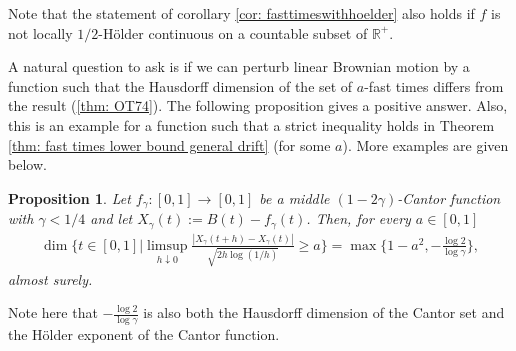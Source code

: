 \documentclass[11pt, reqno]{amsart}
\theoremstyle{plain}
\newtheorem{proposition}[theorem]{Proposition}
\theoremstyle{definition}
\theoremstyle{remark}
\begin{document}
Note that the statement of corollary \ref{cor: fasttimeswithhoelder} also holds if $f$ is not locally $1/2$-{H\"{o}lder } continuous on a countable subset of ${\mathbb{R}}^+$.

A natural question to ask is if we can perturb linear Brownian motion by a function such that the Hausdorff dimension of the set of $a$-fast times differs from the result (\ref{thm: OT74}). The following proposition gives a positive answer.
Also, this is an example for a function such that a strict inequality holds in Theorem \ref{thm: fast times lower bound general drift} (for some $a$).
More examples are given below.
\begin{proposition}\label{prop: fasttimeswithCantorfunction}
Let $f_\gamma \colon [0,1] \to [0,1]$ be a middle $(1-2\gamma)$-Cantor function with $\gamma <1/4$ and let $X_\gamma(t):= B(t)-f_\gamma(t)$. Then, for every $a\in[0,1]$
\begin{align*}
\dim \Big\{ t\in[0,1] \Big| \limsup_{h \downarrow 0} \frac{|X_\gamma(t+h)-X_\gamma(t)|}{\sqrt{2h\log{(1/h)}}} \geq a \Big\}  = \max\Big\{1-a^2, -\frac{\log2}{\log\gamma}\Big\},
\end{align*}
almost surely.
\end{proposition}

Note here that $-\frac{\log2}{\log\gamma}$ is also both the Hausdorff dimension of the Cantor set and the {H\"{o}lder } exponent of the Cantor function.
\end{document}
